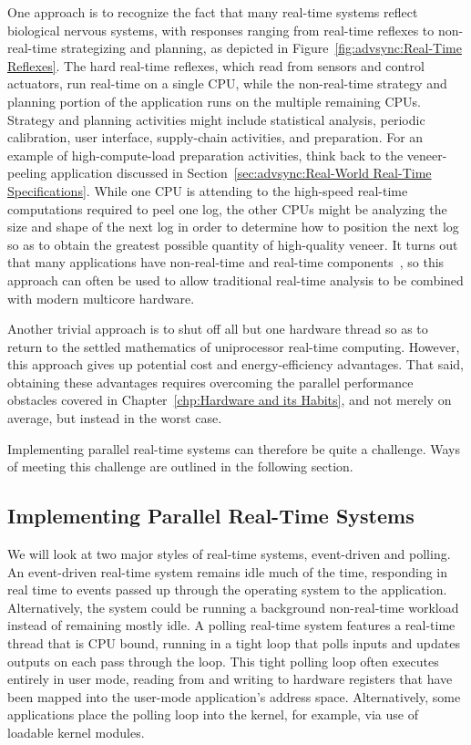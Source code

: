 One approach is to recognize the fact that many real-time systems
reflect biological nervous systems, with responses ranging from
real-time reflexes to non-real-time strategizing and planning,
as depicted in
Figure~\ref{fig:advsync:Real-Time Reflexes}.
The hard real-time reflexes, which read from sensors and control
actuators, run real-time on a single CPU, while the non-real-time
strategy and planning portion of the application runs on the multiple
remaining CPUs.
Strategy and planning activities might include statistical analysis,
periodic calibration, user interface, supply-chain activities, and
preparation.
For an example of high-compute-load preparation activities, think back
to the veneer-peeling application discussed in
Section~\ref{sec:advsync:Real-World Real-Time Specifications}.
While one CPU is attending to the high-speed real-time computations
required to peel one log, the other CPUs might be analyzing the size
and shape of the next log in order to determine how to position the
next log so as to obtain the greatest possible quantity of high-quality
veneer.
It turns out that many applications have non-real-time and real-time
components~\cite{RobertBerry2008IBMSysJ}, so this approach can
often be used to allow traditional real-time analysis to be combined
with modern multicore hardware.

Another trivial approach is to shut off all but one hardware thread so as
to return to the settled mathematics of uniprocessor real-time
computing.
However, this approach gives up potential cost and energy-efficiency
advantages.
That said, obtaining these advantages requires overcoming the parallel
performance obstacles covered in
Chapter~\ref{chp:Hardware and its Habits},
and not merely on average, but instead in the worst case.

Implementing parallel real-time systems can therefore be quite a
challenge.
Ways of meeting this challenge are outlined in the following section.

\subsection{Implementing Parallel Real-Time Systems}
\label{sec:advsync:Implementing Parallel Real-Time Systems}

We will look at two major styles of real-time systems, event-driven and
polling.
An event-driven real-time system remains idle much of the time, responding
in real time to events passed up through the operating system to the
application.
Alternatively, the system could be running a background non-real-time
workload instead of remaining mostly idle.
A polling real-time system features a real-time thread that is CPU bound,
running in a tight loop that polls inputs and updates outputs on each
pass through the loop.
This tight polling loop often executes entirely in user mode, reading from
and writing to hardware registers that have been mapped into the user-mode
application's address space.
Alternatively, some applications place the polling loop into the kernel,
for example, via use of loadable kernel modules.

